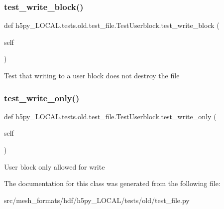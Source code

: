 \subsubsection{\texorpdfstring{test\+\_\+write\+\_\+block()}{test\_write\_block()}}
{\footnotesize\ttfamily def h5py\+\_\+\+L\+O\+C\+A\+L.\+tests.\+old.\+test\+\_\+file.\+Test\+Userblock.\+test\+\_\+write\+\_\+block (\begin{DoxyParamCaption}\item[{}]{self }\end{DoxyParamCaption})}

\begin{DoxyVerb}Test that writing to a user block does not destroy the file \end{DoxyVerb}
 \mbox{\label{classh5py__LOCAL_1_1tests_1_1old_1_1test__file_1_1TestUserblock_a7b5af153f0ba69793fc1060defc6c904}} 
\subsubsection{\texorpdfstring{test\+\_\+write\+\_\+only()}{test\_write\_only()}}
{\footnotesize\ttfamily def h5py\+\_\+\+L\+O\+C\+A\+L.\+tests.\+old.\+test\+\_\+file.\+Test\+Userblock.\+test\+\_\+write\+\_\+only (\begin{DoxyParamCaption}\item[{}]{self }\end{DoxyParamCaption})}

\begin{DoxyVerb}User block only allowed for write \end{DoxyVerb}
 

The documentation for this class was generated from the following file\+:\begin{DoxyCompactItemize}
\item 
src/mesh\+\_\+formats/hdf/h5py\+\_\+\+L\+O\+C\+A\+L/tests/old/test\+\_\+file.\+py\end{DoxyCompactItemize}
